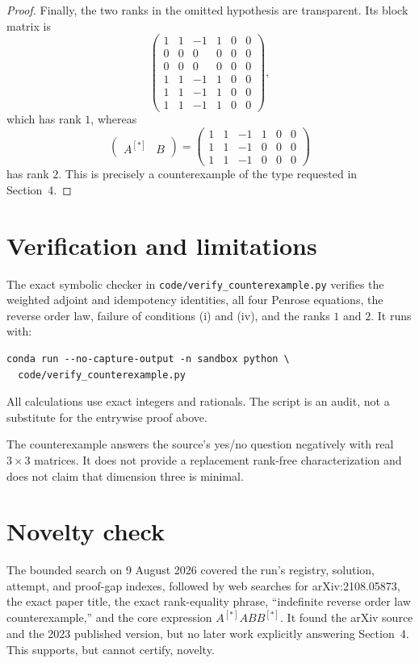 \documentclass[11pt]{article}
\newcommand{\sh}{^{[*]}}
\begin{document}
\begin{proof}
Finally, the two ranks in the omitted hypothesis are transparent.  Its block
matrix is
\[
 \begin{pmatrix}
 1&1&-1&1&0&0\\
 0&0&0&0&0&0\\
 0&0&0&0&0&0\\
 1&1&-1&1&0&0\\
 1&1&-1&1&0&0\\
 1&1&-1&1&0&0
 \end{pmatrix},
\]
which has rank \(1\), whereas
\[
 \begin{pmatrix}A\sh&B\end{pmatrix}
 =\begin{pmatrix}
 1&1&-1&1&0&0\\
 1&1&-1&0&0&0\\
 1&1&-1&0&0&0
 \end{pmatrix}
\]
has rank \(2\).  This is precisely a counterexample of the type requested in
Section~4.
\end{proof}

\section{Verification and limitations}

The exact symbolic checker in
\texttt{code/verify\_counterexample.py} verifies the weighted adjoint and
idempotency identities, all four Penrose equations, the reverse order law,
failure of conditions (i) and (iv), and the ranks \(1\) and \(2\).  It runs
with:
\begin{verbatim}
conda run --no-capture-output -n sandbox python \
  code/verify_counterexample.py
\end{verbatim}
All calculations use exact integers and rationals.  The script is an audit,
not a substitute for the entrywise proof above.

The counterexample answers the source's yes/no question negatively with real
\(3\times3\) matrices.  It does not provide a replacement rank-free
characterization and does not claim that dimension three is minimal.

\section{Novelty check}

The bounded search on 9 August 2026 covered the run's registry, solution,
attempt, and proof-gap indexes, followed by web searches for arXiv:2108.05873,
the exact paper title, the exact rank-equality phrase, ``indefinite reverse
order law counterexample,'' and the core expression
\(A\sh A B B\sh\).  It found the arXiv source and the 2023 published version,
but no later work explicitly answering Section~4.  This supports, but cannot
certify, novelty.
\end{document}
